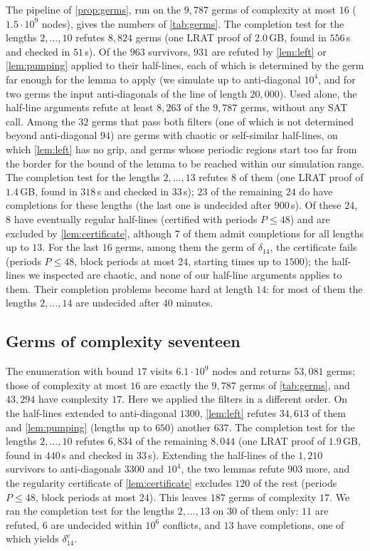 The pipeline of \cref{prop:germs}, run on the $9{,}787$ germs of
complexity at most $16$ ($1.5\cdot10^9$ nodes), gives the numbers of
\cref{tab:germs}. The completion test for the lengths $2,\dots,10$ refutes
$8{,}824$ germs (one LRAT proof of $2.0$\,GB, found in $556$\,s and checked
in $51$\,s). Of the $963$ survivors, $931$ are refuted by \cref{lem:left}
or \cref{lem:pumping} applied to their half-lines, each of which is
determined by the germ far enough for the lemma to apply (we simulate up to
anti-diagonal $10^4$, and for two germs the input anti-diagonals of the
line of length $20{,}000$). Used alone, the half-line arguments refute at
least $8{,}263$ of the $9{,}787$ germs, without any SAT call. Among the $32$ germs
that pass both filters (one of which is not determined beyond anti-diagonal
$94$) are germs with chaotic or self-similar half-lines, on which
\cref{lem:left} has no grip, and germs whose periodic regions start too far
from the border for the bound of the lemma to be reached within our
simulation range. The completion test for the lengths $2,\dots,13$ refutes
$8$ of them (one LRAT proof of $1.4$\,GB, found in $318$\,s and checked in
$33$\,s); $23$ of the remaining $24$ do have completions for these lengths
(the last one is undecided after $900$\,s). Of these $24$, $8$ have
eventually regular half-lines (certified with periods $P\le48$) and are
excluded by \cref{lem:certificate}, although $7$ of them admit completions for
all lengths up to $13$. For the last $16$ germs, among them the germ of
$\delta_{14}$, the certificate fails (periods $P\le48$, block periods at
most $24$, starting times up to $1500$); the half-lines we inspected are
chaotic, and none of our half-line arguments applies to them. Their
completion problems become hard at length $14$: for most of them the lengths
$2,\dots,14$ are undecided after $40$ minutes.

\subsection{Germs of complexity seventeen}\label{app:k17}

The enumeration with bound $17$ visits $6.1\cdot10^{9}$ nodes and returns
$53{,}081$ germs; those of complexity at most $16$ are exactly the
$9{,}787$ germs of \cref{tab:germs}, and $43{,}294$ have complexity $17$.
Here we applied the filters in a different order. On the half-lines
extended to anti-diagonal $1300$, \cref{lem:left} refutes $34{,}613$ of
them and \cref{lem:pumping} (lengths up to $650$) another $637$. The
completion test for the lengths $2,\dots,10$ refutes $6{,}834$ of the
remaining $8{,}044$ (one LRAT proof of $1.9$\,GB, found in $440$\,s and
checked in $33$\,s). Extending the half-lines of the $1{,}210$ survivors to
anti-diagonals $3300$ and $10^4$, the two lemmas refute $903$ more, and the
regularity certificate of \cref{lem:certificate} excludes $120$ of the rest
(periods $P\le48$, block periods at most $24$). This leaves $187$ germs of
complexity $17$. We ran the completion test for the lengths $2,\dots,13$ on
$30$ of them only: $11$ are refuted, $6$ are undecided within $10^6$
conflicts, and $13$ have completions, one of which yields
$\delta_{14}^{\mathrm e}$.

